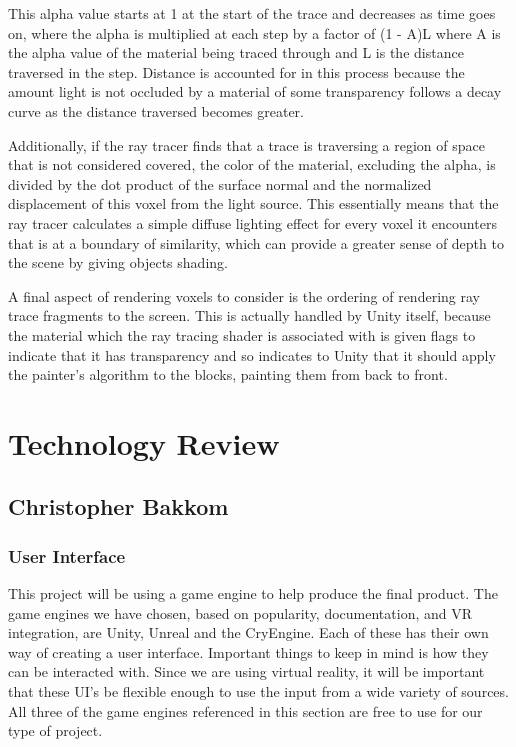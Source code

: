 \documentclass[onecolumn, draftclsnofoot,10pt, compsoc]{IEEEtran}
\newcounter{threesection}[subsubsection]
\newcounter{foursection}[threesection]
\begin{document}
This alpha value starts at 1 at the start of the trace and decreases as time goes on, where the alpha is multiplied at each step by a factor of (1 - A)L where A is the alpha value of the material being traced through and L is the distance traversed in the step.
Distance is accounted for in this process because the amount light is not occluded by a material of some transparency follows a decay curve as the distance traversed becomes greater.

Additionally, if the ray tracer finds that a trace is traversing a region of space that is not considered covered, the color of the material, excluding the alpha, is divided by the dot product of the surface normal and the normalized displacement of this voxel from the light source. This essentially means that the ray tracer calculates a simple diffuse lighting effect for every voxel it encounters that is at a boundary of similarity, which can provide a greater sense of depth to the scene by giving objects shading.


A final aspect of rendering voxels to consider is the ordering of rendering ray trace fragments to the screen.
This is actually handled by Unity itself, because the material which the ray tracing shader is associated with is given flags to indicate that it has transparency and so indicates to Unity that it should apply the painter’s algorithm to the blocks, painting them from back to front.

\pagebreak
\section{Technology Review}

\subsection{Christopher Bakkom}
\subsubsection{User Interface}
This project will be using a game engine to help produce the final product. The game engines we have chosen, based on popularity, documentation, and VR integration, are Unity, Unreal and the CryEngine. Each of these has their own way of creating a user interface. Important things to keep in mind is how they can be interacted with. Since we are using virtual reality, it will be important that these UI's be flexible enough to use the input from a wide variety of sources. All three of the game engines referenced in this section are free to use for our type of project.
\end{document}
